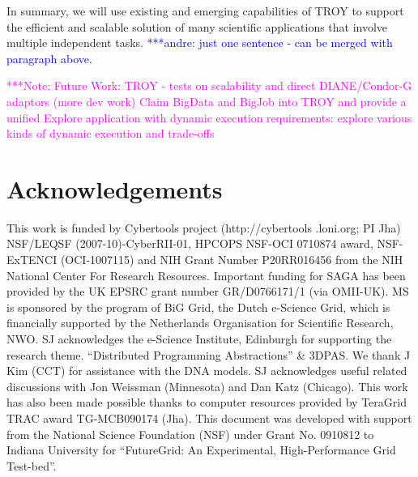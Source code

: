 \documentclass[conference,final]{IEEEtran}
\newcommand{\alnote}[1]{ {\textcolor{blue} { ***andre: #1 }}}
\newcommand{\note}[1]{ {\textcolor{magenta} { ***Note: #1 }}}
\newcommand{\alnote}[1]{}
\newcommand{\note}[1]{}
\newcommand{\up}{\vspace*{-1em}}
\newcommand{\upp}{\vspace*{-0.5em}}
\begin{document}
In summary, we will use existing and emerging capabilities of TROY to
support the efficient and scalable solution of many scientific
applications that involve multiple independent tasks.\alnote{just one sentence - can be merged with paragraph above.}


\note{Future Work: TROY - tests on scalability and direct
  DIANE/Condor-G adaptors (more dev work) Claim BigData and BigJob
  into TROY and provide a unified Explore application with dynamic
  execution requirements: explore various kinds of dynamic execution
  and trade-offs }







\up
\section*{Acknowledgements\upp\upp}
\footnotesize{This work is funded by Cybertools project
  (http://cybertools .loni.org; PI Jha) NSF/LEQSF
  (2007-10)-CyberRII-01, HPCOPS NSF-OCI 0710874 award, NSF-ExTENCI
  (OCI-1007115) and NIH Grant Number P20RR016456 from the NIH National
  Center For Research Resources. Important funding for SAGA has been
  provided by the UK EPSRC grant number GR/D0766171/1 (via OMII-UK).
  MS is sponsored by the program of BiG Grid, the Dutch e-Science
  Grid, which is financially supported by the Netherlands Organisation
  for Scientific Research, NWO. SJ acknowledges the e-Science
  Institute, Edinburgh for supporting the research
  theme. ``Distributed Programming Abstractions'' \& 3DPAS. We thank J
  Kim (CCT) for assistance with the DNA models.  SJ acknowledges
  useful related discussions with Jon Weissman (Minnesota) and Dan
  Katz (Chicago). This work has also been made possible thanks to
  computer resources provided by TeraGrid TRAC award TG-MCB090174
  (Jha). This document was developed with support from the National
  Science Foundation (NSF) under Grant No.  0910812 to Indiana
  University for ``FutureGrid: An Experimental, High-Performance Grid
  Test-bed''.}
\up
%


\end{document}
